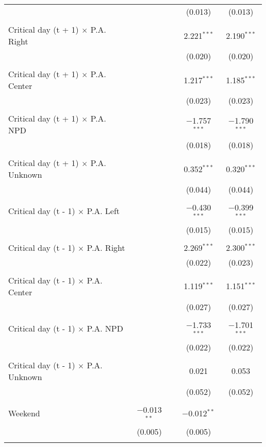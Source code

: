 \documentclass[
]{article}
\begin{document}
\begin{table}[!htbp]
{\begin{tabular}{@{\extracolsep{5pt}}lcccc}
  &  &  & (0.013) & (0.013) \\ 
  & & & & \\ 
 Critical day (t + 1) $\times$ P.A. Right &  &  & 2.221$^{***}$ & 2.190$^{***}$ \\ 
  &  &  & (0.020) & (0.020) \\ 
  & & & & \\ 
 Critical day (t + 1) $\times$ P.A. Center &  &  & 1.217$^{***}$ & 1.185$^{***}$ \\ 
  &  &  & (0.023) & (0.023) \\ 
  & & & & \\ 
 Critical day (t + 1) $\times$ P.A. NPD &  &  & $-$1.757$^{***}$ & $-$1.790$^{***}$ \\ 
  &  &  & (0.018) & (0.018) \\ 
  & & & & \\ 
 Critical day (t + 1) $\times$ P.A. Unknown &  &  & 0.352$^{***}$ & 0.320$^{***}$ \\ 
  &  &  & (0.044) & (0.044) \\ 
  & & & & \\ 
 Critical day (t - 1) $\times$ P.A. Left &  &  & $-$0.430$^{***}$ & $-$0.399$^{***}$ \\ 
  &  &  & (0.015) & (0.015) \\ 
  & & & & \\ 
 Critical day (t - 1) $\times$ P.A. Right &  &  & 2.269$^{***}$ & 2.300$^{***}$ \\ 
  &  &  & (0.022) & (0.023) \\ 
  & & & & \\ 
 Critical day (t - 1) $\times$ P.A. Center &  &  & 1.119$^{***}$ & 1.151$^{***}$ \\ 
  &  &  & (0.027) & (0.027) \\ 
  & & & & \\ 
 Critical day (t - 1) $\times$ P.A. NPD &  &  & $-$1.733$^{***}$ & $-$1.701$^{***}$ \\ 
  &  &  & (0.022) & (0.022) \\ 
  & & & & \\ 
 Critical day (t - 1) $\times$ P.A. Unknown &  &  & 0.021 & 0.053 \\ 
  &  &  & (0.052) & (0.052) \\ 
  & & & & \\ 
 Weekend & $-$0.013$^{**}$ &  & $-$0.012$^{**}$ &  \\ 
  & (0.005) &  & (0.005) &  \\ 
  & & & & \\ 

\end{tabular}}
\end{table}
\end{document}
